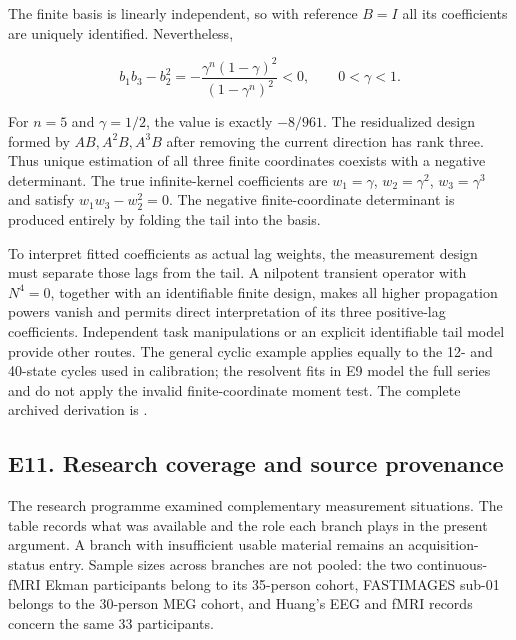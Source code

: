 \documentclass[11pt,a4paper]{article}
\begin{document}
\par
\noindent\begin{minipage}{\linewidth}

The finite basis is linearly independent, so with reference \(B=I\) all
its coefficients are uniquely identified. Nevertheless,

\[
b_1b_3-b_2^2
=-\frac{\gamma^n(1-\gamma)^2}{(1-\gamma^n)^2}<0,
\qquad 0<\gamma<1.
\]

\end{minipage}\par

For \(n=5\) and \(\gamma=1/2\), the value is exactly \(-8/961\). The
residualized design formed by \(AB,A^2B,A^3B\) after removing the
current direction has rank three. Thus unique estimation of all three
finite coordinates coexists with a negative determinant. The true
infinite-kernel coefficients are \(w_1=\gamma\), \(w_2=\gamma^2\),
\(w_3=\gamma^3\) and satisfy \(w_1w_3-w_2^2=0\). The negative
finite-coordinate determinant is produced entirely by folding the tail
into the basis.

To interpret fitted coefficients as actual lag weights, the measurement
design must separate those lags from the tail. A nilpotent transient
operator with \(N^4=0\), together with an identifiable finite design,
makes all higher propagation powers vanish and permits direct
interpretation of its three positive-lag coefficients. Independent task
manipulations or an explicit identifiable tail model provide other
routes. The general cyclic example applies equally to the 12- and
40-state cycles used in calibration; the resolvent fits in E9 model the
full series and do not apply the invalid finite-coordinate moment test.
The complete archived derivation is
.

\subsection{E11. Research coverage and source
provenance}\label{e11.-research-coverage-and-source-provenance}

The research programme examined complementary measurement situations.
The table records what was available and the role each branch plays in
the present argument. A branch with insufficient usable material remains
an acquisition-status entry. Sample sizes across branches are not
pooled: the two continuous-fMRI Ekman participants belong to its
35-person cohort, FASTIMAGES sub-01 belongs to the 30-person MEG cohort,
and Huang's EEG and fMRI records concern the same 33 participants.
\end{document}
